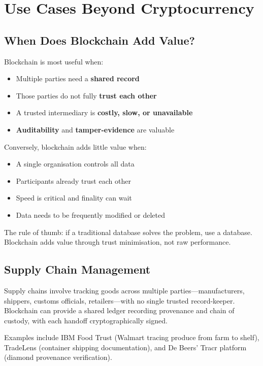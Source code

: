 \documentclass[11pt,a4paper]{article}
\begin{document}
\section{Use Cases Beyond Cryptocurrency}

\subsection{When Does Blockchain Add Value?}

Blockchain is most useful when:
\begin{itemize}
    \item Multiple parties need a \textbf{shared record}
    \item Those parties do not fully \textbf{trust each other}
    \item A trusted intermediary is \textbf{costly, slow, or unavailable}
    \item \textbf{Auditability} and \textbf{tamper-evidence} are valuable
\end{itemize}

Conversely, blockchain adds little value when:
\begin{itemize}
    \item A single organisation controls all data
    \item Participants already trust each other
    \item Speed is critical and finality can wait
    \item Data needs to be frequently modified or deleted
\end{itemize}

The rule of thumb: if a traditional database solves the problem, use a database. Blockchain adds value through trust minimisation, not raw performance.

\subsection{Supply Chain Management}

Supply chains involve tracking goods across multiple parties---manufacturers, shippers, customs officials, retailers---with no single trusted record-keeper. Blockchain can provide a shared ledger recording provenance and chain of custody, with each handoff cryptographically signed.

Examples include IBM Food Trust (Walmart tracing produce from farm to shelf), TradeLens (container shipping documentation), and De Beers' Tracr platform (diamond provenance verification).
\end{document}
